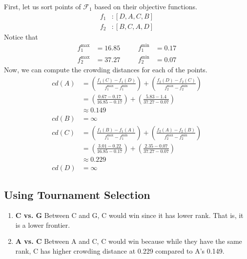 First, let us sort points of \(\mathcal{F}_1\) based on their objective functions.
\[
\begin{aligned}
    f_1 &: [D, A, C, B] \\
    f_2 &: [B, C, A, D]
\end{aligned}
\]
Notice that
\[
\begin{aligned}
    f_1^{\max} &= 16.85 &\quad& f_1^{\min} &= 0.17 \\
    f_2^{\max} &= 37.27 &\quad& f_2^{\min} &= 0.07
\end{aligned}
\]
Now, we can compute the crowding distances for each of the points.
\[
\begin{aligned}
    cd(A) &= \left(\frac{f_1(C) - f_1(D)}{f_1^{\max} - f_1^{\min}}\right) + \left(\frac{f_2(D) - f_2(C)}{f_2^{\max} - f_2^{\min}}\right) \\
          &= \left(\frac{0.67 - 0.17}{16.85 - 0.17}\right) + \left(\frac{5.83 - 1.4}{37.27 - 0.07}\right) \\
          &\approx 0.149 \\
    cd(B) &= \infty \\
    cd(C) &= \left(\frac{f_1(B) - f_1(A)}{f_1^{\max} - f_1^{\min}}\right) + \left(\frac{f_2(A) - f_2(B)}{f_2^{\max} - f_2^{\min}}\right) \\
          &= \left(\frac{3.01 - 0.22}{16.85 - 0.17}\right) + \left(\frac{2.35 - 0.07}{37.27 - 0.07}\right) \\
          &\approx 0.229 \\
    cd(D) &= \infty
\end{aligned}
\]

\subsection{Using Tournament Selection}

\begin{enumerate}[label=(\alph*.)]
    \item \textbf{C vs. G} Between C and G, C would win since it has lower rank. That is, it is a lower frontier.
    \item \textbf{A vs. C} Between A and C, C would win because while they have the same rank, C has higher crowding distance at 0.229 compared to A's 0.149.
\end{enumerate}
